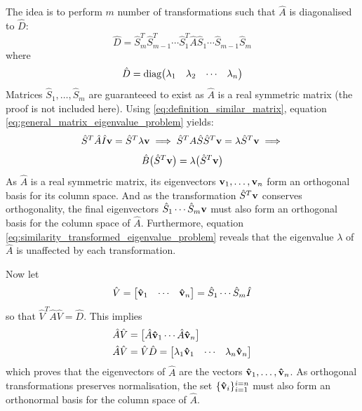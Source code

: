 \documentclass[reprint,english]{revtex4-1}
\begin{document}
The idea is to perform \(m\) number of transformations such that \(\hat{A}\) is diagonalised to \(\hat{D}\):
\begin{equation}
\hat{D}=\hat{S}_m^T\hat{S}_{m-1}^T\cdots\hat{S}_1^T\hat{A}\hat{S}_1\cdots\hat{S}_{m-1}\hat{S}_m
\end{equation}
where
\begin{equation}
\hat{D}=\text{diag}\mqty(\lambda_1&\lambda_2&\cdots&\lambda_n)
\end{equation}
Matrices \(\hat{S}_1,\ldots,\hat{S}_m\) are guaranteeed to exist as \(\hat{A}\) is a real symmetric matrix (the proof is not included here). Using \eqref{eq:definition_similar_matrix}, equation \eqref{eq:general_matrix_eigenvalue_problem} yields:
\[\hat{S}^T\hat{A}\hat{I}\vb{v}=\hat{S}^T\lambda\vb{v}\implies\hat{S}^TA\hat{S}\hat{S}^T\vb{v}=\lambda\hat{S}^T\vb{v}\implies\]
\begin{equation}\label{eq:similarity_transformed_eigenvalue_problem}
\hat{B}\big(\hat{S}^T\vb{v}\big)=\lambda\big(\hat{S}^T\vb{v}\big)
\end{equation}
As \(\hat{A}\) is a real symmetric matrix, its eigenvectors \(\vb{v}_1,\ldots,\vb{v}_n\) form an orthogonal basis for its column space. And as the transformation \(\hat{S}^T\vb{v}\) conserves orthogonality, the final eigenvectors \(\hat{S}_1\cdots\hat{S}_m\vb{v}\) must also form an orthogonal basis for the column space of \(\hat{A}\). Furthermore, equation \eqref{eq:similarity_transformed_eigenvalue_problem} reveals that the eigenvalue \(\lambda\) of \(\hat{A}\) is unaffected by each transformation.

Now let
\begin{equation}
\hat{V}=\mqty[\vu{v}_1&\cdots&\vu{v}_n]=\hat{S}_1\cdots\hat{S}_m\hat{I}
\end{equation}
so that \(\hat{V}^T\hat{A}\hat{V}=\hat{D}\). This implies
\begin{subequations}
\begin{align}
\hat{A}\hat{V}&=\mqty[\hat{A}\vu{v}_1\cdots\hat{A}\vu{v}_n]\\
\hat{A}\hat{V}&=\hat{V}\hat{D}=\mqty[\lambda_1\vu{v}_1&\cdots&\lambda_n\vu{v}_n]
\end{align}
\end{subequations}
which proves that the eigenvectors of \(\hat{A}\) are the vectors \(\vu{v}_1,\ldots,\vu{v}_n\). As orthogonal transformations preserves normalisation, the set \(\{\vu{v}_i\}_{i=1}^{i=n}\) must also form an orthonormal basis for the column space of \(\hat{A}\).
\end{document}
